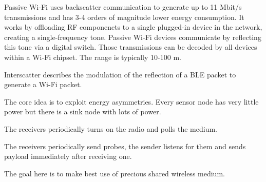 \begin{mytitle}[Passive Wi-Fi] Passive Wi-Fi uses backscatter communication to generate up to 11 Mbit/s transmissions and has 3-4 orders of magnitude lower energy consumption. It works by offloading RF componenets to a single plugged-in device in the network, creating a single-frequency tone. Passive Wi-Fi devices communicate by reflecting this tone via a digital switch. Those transmissions can be decoded by all devices within a Wi-Fi chipset. The range is typically 10-100 m.
\end{mytitle}
\begin{mytitle}[Interscatter] Interscatter describes the modulation of the reflection of a BLE packet to generate a Wi-Fi packet.
\end{mytitle}
\begin{mytitle} The core idea is to exploit energy asymmetries. Every sensor node has very little power but there is a sink node with lots of power.
    \begin{mysubtitle} The receivers periodically turns on the radio and polls the medium.
    \end{mysubtitle}
    \begin{mysubtitle} The receivers periodically send probes, the sender listens for them and sends payload immediately after receiving one.
    \end{mysubtitle}
\end{mytitle}
\begin{mytitle}[Multiplexing] The goal here is to make best use of precious shared wireless medium.
\end{mytitle}

